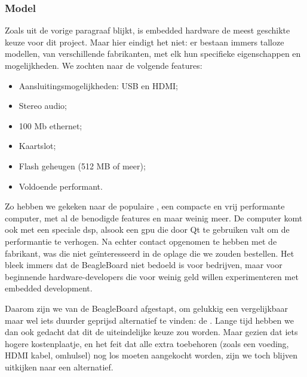 \subsubsection{Model}

Zoals uit de vorige paragraaf blijkt, is embedded hardware de meest geschikte keuze voor dit project. Maar hier eindigt het niet: er bestaan immers talloze modellen, van verschillende fabrikanten, met elk hun specifieke eigenschappen en mogelijkheden. We zochten naar de volgende features:
\begin{itemize}
\item Aansluitingsmogelijkheden: USB en HDMI;
\item Stereo audio;
\item 100 Mb ethernet;
\item Kaartslot;
\item Flash geheugen (512 MB of meer);
\item Voldoende performant.
\end{itemize}

Zo hebben we gekeken naar de populaire , een compacte en vrij performante computer, met al de benodigde features en maar weinig meer. De computer komt ook met een speciale \ac{dsp}, alsook een \ac{gpu} die door Qt te gebruiken valt om de performantie te verhogen. Na echter contact opgenomen te hebben met de fabrikant, was die niet geïnteresseerd in de oplage die we zouden bestellen. Het bleek immers dat de BeagleBoard niet bedoeld is voor bedrijven, maar voor beginnende hardware-developers die voor weinig geld willen experimenteren met embedded development.

Daarom zijn we van de BeagleBoard afgestapt, om gelukkig een vergelijkbaar maar wel iets duurder geprijsd alternatief te vinden: de . Lange tijd hebben we dan ook gedacht dat dit de uiteindelijke keuze zou worden. Maar gezien dat iets hogere kostenplaatje, en het feit dat alle extra toebehoren (zoals een voeding, HDMI kabel, omhulsel) nog los moeten aangekocht worden, zijn we toch blijven uitkijken naar een alternatief.


